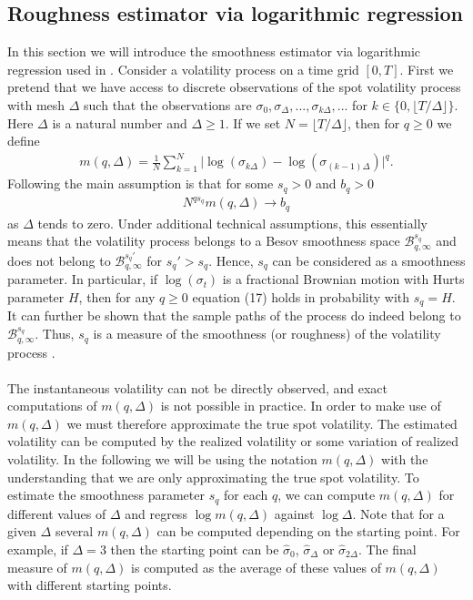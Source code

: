 \documentclass{article}
\begin{document}
\subsection{Roughness estimator via logarithmic regression} 
In this section we will introduce the smoothness estimator via logarithmic regression used in \cite{gatheral}. Consider a volatility process on a time grid $[0,T]$. First we pretend that we have access to discrete observations of the spot volatility process with mesh $\Delta$ such that the observations are $\sigma_0, \sigma_\Delta, ..., \sigma_{k\Delta},...$ for $k \in \{0, \lfloor T / \Delta \rfloor\}$. Here $\Delta$ is a natural number and $\Delta\geq 1$. If we set $N=\lfloor T / \Delta \rfloor$, then for $q\geq 0$ we define
\begin{align*}
m(q,\Delta) = \frac{1}{N} \sum_{k=1}^N \lvert \log(\sigma_{k\Delta})-\log(\sigma_{(k-1)\Delta})\rvert^q.
\end{align*}
Following \cite{gatheral} the main assumption is that for some $s_q>0$ and $b_q>0$
\begin{align}
N^{qs_q}m(q,\Delta)\to b_q
\end{align}
as $\Delta$ tends to zero. Under additional technical assumptions, this essentially means that the volatility process belongs to a Besov smoothness space $\mathcal{B}^{s_q}_{q,\infty}$ and does not belong to $\mathcal{B}^{s_q'}_{q,\infty}$ for $s_q'>s_q$. Hence, $s_q$ can be considered as a smoothness parameter. In particular, if $\log(\sigma_t)$ is a fractional Brownian motion with Hurts parameter $H$, then for any $q\geq 0$  equation (17) holds in probability with $s_q=H$. It can further be shown that the sample paths of the process do indeed belong to $\mathcal{B}^{s_q}_{q,\infty}$. Thus, $s_q$ is a measure of the smoothness (or roughness) of the volatility process \cite{gatheral}.\\\\
The instantaneous volatility can not be directly observed, and exact computations of $m(q,\Delta)$ is not possible in practice.  In order to make use of $m(q,\Delta)$ we must therefore approximate the true spot volatility. The estimated volatility can be computed by the realized volatility or some variation of realized volatility. In the following we will be using the notation $m(q, \Delta)$ with the understanding that we are only approximating the true spot volatility. To estimate the smoothness parameter $s_q$ for each $q$, we can compute $m(q,\Delta)$ for different values of $\Delta$ and regress $\log m(q,\Delta)$ against $\log \Delta$. Note that for a given $\Delta$ several $m(q,\Delta)$ can be computed depending on the starting point. For example, if $\Delta=3$ then the starting point can be $\hat{\sigma}_0$, $\hat{\sigma}_{\Delta}$ or $\hat{\sigma}_{2\Delta}$. The final measure of $m(q,\Delta)$ is computed as the average of these values of $m(q,\Delta)$ with different starting points.\\\\
\end{document}
